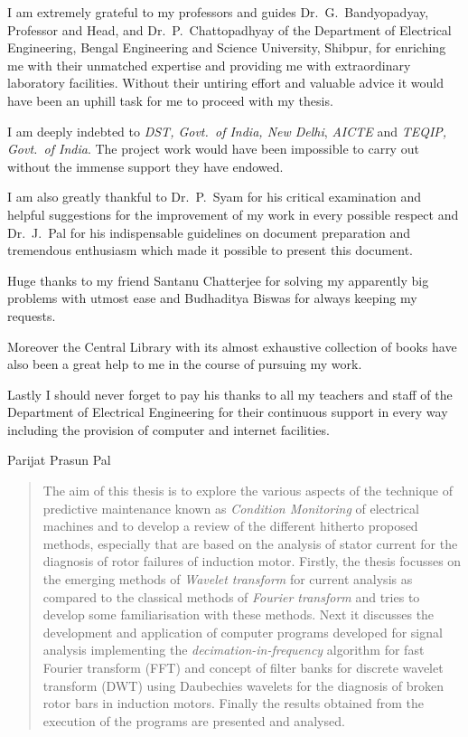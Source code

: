 \documentclass[a4paper,11pt]{report}
\begin{document}
\noindent I am extremely grateful to my professors and guides Dr.~G.~Bandyopadyay, Professor and Head, and Dr.~P.~Chattopadhyay of the Department of Electrical Engineering, Bengal Engineering and Science University, Shibpur, for enriching me with their unmatched expertise and providing me with extraordinary laboratory facilities. Without their untiring effort and valuable advice it would have been an uphill task for me to proceed with my thesis. 

I am deeply indebted to \emph{DST, Govt.~of India, New Delhi}, \emph{AICTE} and \emph{TEQIP, Govt.~of India}. The project work would have been impossible to carry out without the immense support they have endowed. 

I am also greatly thankful to Dr.~P.~Syam for his critical examination and helpful suggestions for the improvement of my work in every possible respect and Dr.~J.~Pal for his indispensable guidelines on document preparation and tremendous enthusiasm which made it possible to present this document.

Huge thanks to my friend Santanu Chatterjee for solving my apparently big problems with utmost ease and Budhaditya Biswas for always keeping my requests.

Moreover the Central Library with its almost exhaustive collection of books have also been a great help to me in the course of pursuing my work. 

Lastly I should never forget to pay his thanks to all my teachers and staff of the Department of Electrical Engineering for their continuous support in every way including the provision of computer and internet facilities.

\vspace{25mm}
\hspace*{100mm} Parijat Prasun Pal

\tableofcontents
\listoffigures
\listoftables

\begin{abstract}
The aim of this thesis is to explore the various aspects of the technique of predictive maintenance known as \emph{Condition Monitoring} of electrical machines and to develop a review of the different hitherto proposed methods, especially that are based on the analysis of stator current for the diagnosis of rotor failures of induction motor. Firstly, the thesis focusses on the emerging methods of \emph{Wavelet transform} for current analysis as compared to the classical methods of \emph{Fourier transform} and tries to develop some familiarisation with these methods. Next it discusses the development and application of computer programs developed for signal analysis implementing the \emph{decimation-in-frequency} algorithm for fast Fourier transform (FFT) and concept of filter banks for discrete wavelet transform (DWT) using Daubechies wavelets for the diagnosis of broken rotor bars in induction motors. Finally the results obtained from the execution of the programs are presented and analysed.
\end{abstract}
\end{document}
